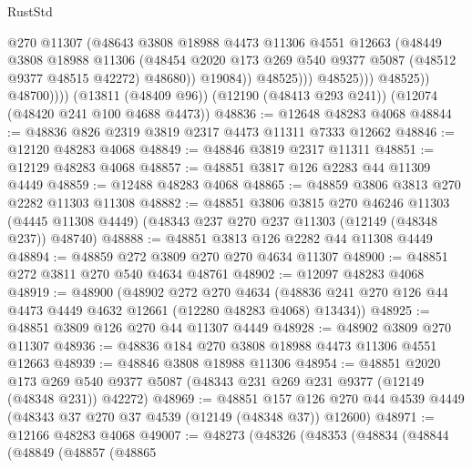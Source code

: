 \begin{lexlean}{RustStd}
\begin{coremodule}
                              @270
                              @11307
                              (@48643
                                @3808
                                @18988
                                @4473
                                @11306
                                @4551
                                @12663
                                (@48449
                                  @3808
                                  @18988
                                  @11306
                                  (@48454
                                    @2020
                                    @173
                                    @269
                                    @540
                                    @9377
                                    @5087
                                    (@48512 @9377 @48515 @42272)
                                    @48680))
                                @19084))
                            @48525)))
                      @48525)))
                @48525))
            @48700))))
    (@13811 (@48409 @96))
    (@12190 (@48413 @293 @241))
    (@12074 (@48420 @241 @100 @4688 @4473))
@48836 := @12648 @48283 @4068
@48844 := @48836 @826 @2319 @3819 @2317 @4473 @11311 @7333 @12662
@48846 := @12120 @48283 @4068
@48849 := @48846 @3819 @2317 @11311
@48851 := @12129 @48283 @4068
@48857 := @48851 @3817 @126 @2283 @44 @11309 @4449
@48859 := @12488 @48283 @4068
@48865 := @48859 @3806 @3813 @270 @2282 @11303 @11308
@48882 := @48851
    @3806
    @3815
    @270
    @46246
    @11303
    (@4445 @11308 @4449)
    (@48343 @237 @270 @237 @11303 (@12149 (@48348 @237)) @48740)
@48888 := @48851 @3813 @126 @2282 @44 @11308 @4449
@48894 := @48859 @272 @3809 @270 @270 @4634 @11307
@48900 := @48851 @272 @3811 @270 @540 @4634 @48761
@48902 := @12097 @48283 @4068
@48919 := @48900
    (@48902
      @272
      @270
      @4634
      (@48836 @241 @270 @126 @44 @4473 @4449 @4632 @12661 (@12280 @48283 @4068) @13434))
@48925 := @48851 @3809 @126 @270 @44 @11307 @4449
@48928 := @48902 @3809 @270 @11307
@48936 := @48836 @184 @270 @3808 @18988 @4473 @11306 @4551 @12663
@48939 := @48846 @3808 @18988 @11306
@48954 := @48851
    @2020
    @173
    @269
    @540
    @9377
    @5087
    (@48343 @231 @269 @231 @9377 (@12149 (@48348 @231)) @42272)
@48969 := @48851
    @157
    @126
    @270
    @44
    @4539
    @4449
    (@48343 @37 @270 @37 @4539 (@12149 (@48348 @37)) @12600)
@48971 := @12166 @48283 @4068
@49007 := @48273
    (@48326
      (@48353
        (@48834
          (@48844
            (@48849
              (@48857
                (@48865

\end{coremodule}
\end{lexlean}
